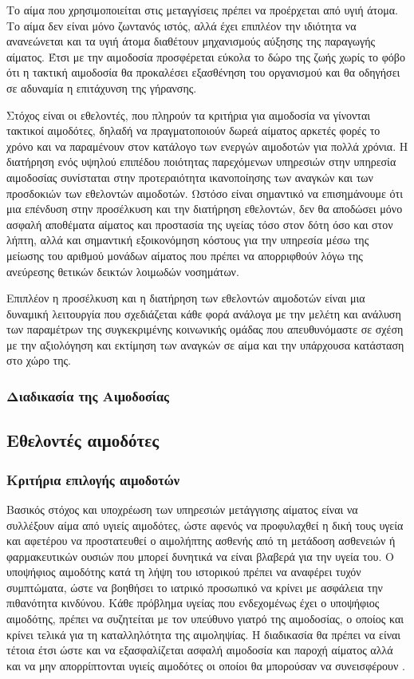 	 Το αίμα που χρησιμοποιείται στις μεταγγίσεις πρέπει να προέρχεται από υγιή άτομα. Το αίμα δεν είναι μόνο ζωντανός ιστός, αλλά έχει επιπλέον την ιδιότητα να ανανεώνεται και τα υγιή άτομα διαθέτουν μηχανισμούς αύξησης της παραγωγής αίματος. Έτσι με την αιμοδοσία προσφέρεται εύκολα το δώρο της ζωής χωρίς το φόβο ότι η τακτική αιμοδοσία θα προκαλέσει εξασθένηση του οργανισμού και θα οδηγήσει σε αδυναμία η επιτάχυνση της γήρανσης.
	 
	Στόχος είναι οι εθελοντές, που πληρούν τα κριτήρια για αιμοδοσία να γίνονται τακτικοί αιμοδότες, δηλαδή να πραγματοποιούν δωρεά αίματος αρκετές φορές το χρόνο και να παραμένουν στον κατάλογο των ενεργών αιμοδοτών για πολλά χρόνια. Η διατήρηση ενός υψηλού επιπέδου ποιότητας παρεχόμενων υπηρεσιών στην υπηρεσία αιμοδοσίας συνίσταται στην προτεραιότητα ικανοποίησης των αναγκών και των προσδοκιών των εθελοντών αιμοδοτών. Ωστόσο είναι σημαντικό να επισημάνουμε ότι μια επένδυση στην προσέλκυση και την διατήρηση εθελοντών, δεν θα αποδώσει μόνο ασφαλή αποθέματα αίματος και προστασία της υγείας τόσο στον δότη όσο και στον λήπτη, αλλά και σημαντική εξοικονόμηση κόστους για την υπηρεσία μέσω της μείωσης του αριθμού μονάδων αίματος που πρέπει να απορριφθούν λόγω της ανεύρεσης θετικών δεικτών λοιμωδών νοσημάτων. 
	
	Επιπλέον η προσέλκυση και η διατήρηση των εθελοντών αιμοδοτών είναι μια δυναμική λειτουργία που σχεδιάζεται κάθε φορά ανάλογα με την μελέτη και ανάλυση των παραμέτρων της συγκεκριμένης κοινωνικής ομάδας που απευθυνόμαστε σε σχέση με την αξιολόγηση και εκτίμηση των αναγκών σε αίμα και την υπάρχουσα κατάσταση στο χώρο της.
		\subsubsection{Διαδικασία της Αιμοδοσίας}
		
	\subsection{Εθελοντές αιμοδότες}
		\subsubsection{Κριτήρια επιλογής αιμοδοτών} 
			Βασικός στόχος και υποχρέωση των υπηρεσιών μετάγγισης αίματος είναι να συλλέξουν αίμα από υγιείς αιμοδότες, ώστε αφενός να προφυλαχθεί η δική τους υγεία και αφετέρου να προστατευθεί ο αιμολήπτης ασθενής από τη μετάδοση ασθενειών ή φαρμακευτικών ουσιών που μπορεί δυνητικά να είναι βλαβερά για την υγεία του. Ο υποψήφιος αιμοδότης κατά τη λήψη του ιστορικού πρέπει να αναφέρει τυχόν συμπτώματα, ώστε να βοηθήσει το ιατρικό προσωπικό να κρίνει με ασφάλεια την πιθανότητα κινδύνου. Κάθε πρόβλημα υγείας που ενδεχομένως έχει ο υποψήφιος αιμοδότης, πρέπει να συζητείται με τον υπεύθυνο γιατρό της αιμοδοσίας, ο οποίος και κρίνει τελικά για τη καταλληλότητα της αιμοληψίας. Η διαδικασία θα πρέπει να είναι τέτοια έτσι ώστε και να εξασφαλίζεται ασφαλή αιμοδοσία και παροχή αίματος αλλά και να μην απορρίπτονται υγιείς αιμοδότες οι οποίοι θα μπορούσαν να συνεισφέρουν \cite{bloodDonorSelection}.
			
